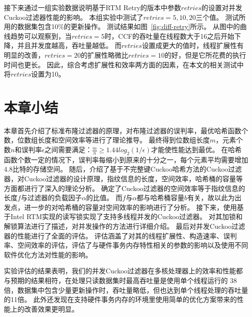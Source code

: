接下来通过一组实验数据说明基于RTM Retry的版本中参数$retries$的设置对并发Cuckoo过滤器性能的影响。
本组实验中测试了$retries = 5, 10, 20$三个值。
测试所用的数据集包含10\%的更新操作。
测试结果如图~\ref{fig:diff-retry}所示。
从图中的曲线趋势可以观察到，当$retries = 5$时，CCF的吞吐量在线程数大于16之后开始下降，并且并发度越高，吞吐量越低。
而$retries$设置成更大的值时，线程扩展性有明显的改善，$retries = 20$的扩展性略微比$retries = 10$的好，但是它所花费的执行时间也更长。
因此，综合考虑扩展性和效率两方面的因素，在本文的相关测试中将$retries$设置为10。

\section{本章小结}
本章首先介绍了标准布隆过滤器的原理，对布隆过滤器的误判率，最优哈希函数个数，位数组长度和空间效率等进行了理论推导。
最终得到位数组长度$m$，元素个数$n$和误判率$\epsilon$之间需要满足：$\frac{m}{n} \geq 1.44 log_2({1/\epsilon})$才能使性能达到最优。
在哈希函数个数一定的情况下，误判率每缩小到原来的十分之一，每个元素平均需要增加4.8比特的存储空间。
随后，介绍了基于不完整键Cuckoo哈希方法的Cuckoo过滤器，对Cuckoo过滤器的设计原理，指纹信息的长度，空间效率，哈希桶的容量等方面都进行了深入的理论分析。
确定了Cuckoo过滤器的空间效率等于指纹信息的长度$f$与过滤器的负载因子$\alpha$的比值。
而$f$与$\alpha$都与哈希桶容量$b$有关，故以此为出发点，进一步的对哈希桶的容量对空间效率的影响进行了分析。
接下来，使用基于Intel RTM实现的读写锁实现了支持多线程并发的Cuckoo过滤器。
对其加锁和解锁算法进行了描述，对并发操作的方法进行详细介绍。
最后对并发Cuckoo过滤器的性能进行了全面的评估。
评估涵盖了对其的线程扩展性、构造速率、误判率、空间效率的评估，评估了与硬件事务内存特性相关的参数的影响以及使用不同软件优化方法对性能的影响。

实验评估的结果表明，我们的并发Cuckoo过滤器在多核处理器上的效率和性能都与预期的结果相符，在处理只读数据集时最高吞吐量是使用单个线程运行的
38倍，数据集中包含少量更新操作时，吞吐量略低，但也达到单个线程处理的吞吐量的11倍。
此外还发现在支持硬件事务内存的环境里使用简单的优化方案带来的性能上的改善效果更明显。







